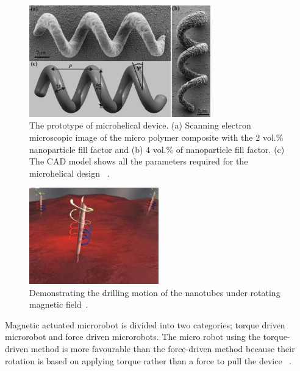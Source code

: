 \documentclass[12pt,a4paper,titlepage]{report}
\begin{document}
\begin{figure}
  \centering
    \includegraphics[width=0.7\textwidth]{8}
  \caption{ The prototype of microhelical device. (a) Scanning electron microscopic image of the micro polymer composite
with the 2 vol.\% nanoparticle fill factor and (b) 4 vol.\% of nanoparticle fill factor. (c) The CAD model
shows all the parameters required for the microhelical design ~\citep{peyer2013bacteria}.}
  \label{ref8}
\end{figure}






\begin{figure}
  \begin{center}
    \includegraphics[width=0.5\textwidth]{nanoJet3}
  \caption{Demonstrating the drilling motion of the nanotubes under rotating
 magnetic field~\citep{C2NR32798H}.}
  \label{nanotube}
\end{center}
\end{figure}



Magnetic actuated microrobot is divided into two categories; torque driven microrobot and force
 driven microrobots.
The micro robot using the torque-driven method is more favourable than the force-driven method 
because their rotation is based on applying torque rather than a force to pull the device ~\citep{peyer2013bacteria}.
\end{document}
